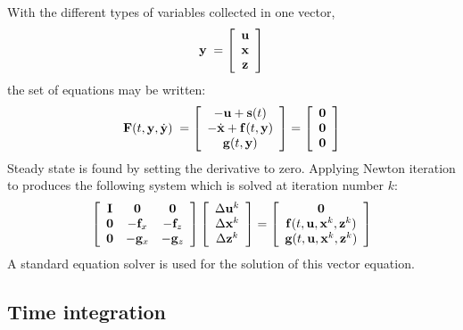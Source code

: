With the different types of variables collected in one vector,
%
\begin{equation}
{\bf y} \;= \left[\begin{array}{c}
{\bf u} \\ {\bf x} \\ {\bf z}
\end{array}\right]
\label{eqC:93}
\end{equation}
%
the set of equations may be written:
%
\begin{equation}
{\bf F}(t,{\bf y},\dot{\bf y}) \;=
\left[\begin{array}{c}
-{\bf u} + {\bf s}(t) \\
-\dot{\bf x} + {\bf f}(t,{\bf y}) \\
{\bf g}(t,{\bf y}) \\
\end{array}\right] =
\left[\begin{array}{c}
{\bf 0} \\ {\bf 0} \\ {\bf 0}
\end{array}\right]
\label{eqC:94}
\end{equation}
%
Steady state is found by setting the derivative to zero.
Applying Newton iteration to  produces the following system
which is solved at iteration number $k$:
%
\begin{equation}
\left[\begin{array}{ccc}
{\bf I} &  {\bf 0}   &  {\bf 0}   \\
{\bf 0} & -{\bf f}_x & -{\bf f}_z \\
{\bf 0} & -{\bf g}_x & -{\bf g}_z
\end{array}\right]\left[\begin{array}{c}
\Delta{\bf u}^k \\
\Delta{\bf x}^k \\
\Delta{\bf z}^k
\end{array}\right] = \left[\begin{array}{c}
{\bf 0} \\
{\bf f}(t,{\bf u},{\bf x}^k,{\bf z}^k) \\
{\bf g}(t,{\bf u},{\bf x}^k,{\bf z}^k)
\end{array}\right]
\label{eqC:95}
\end{equation}
%
A standard equation solver is used for the solution of this vector equation.

\subsection{Time integration}

